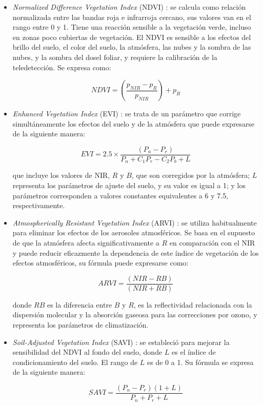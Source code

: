 \begin{itemize}
	\item \textit{Normalized Difference Vegetation Index} (NDVI) \citep{Xue2017}: se calcula como 
	   	relación normalizada entre las bandas roja e infrarroja cercano, sus valores van en el rango
	   	entre 0 y 1. Tiene una reacción sensible a la vegetación verde, incluso en zonas poco cubiertas
		de vegetación. El NDVI es sensible a los efectos del brillo del suelo, el color del suelo,
		la atmósfera, las nubes y la sombra de las nubes, y la sombra del dosel foliar, y requiere
		la calibración de la teledetección. Se expresa como:
	
		\begin{equation}
			NDVI = \left( \frac{p_{NIR} - p_{R}}{p_{NIR}} \right) + p_{R}
		\end{equation}

	\item \textit{Enhanced Vegetation Index} (EVI) \citep{Xue2017}: se trata de un parámetro que corrige simultáneamente 
		los efectos del suelo y de la atmósfera que puede expresarse de la siguiente manera:
	
		\begin{equation}
			EVI = 2.5 \times \frac{(P_n - P_r)}{P_n + C_1 P_r - C_2 P_b + L}
		\end{equation}
				
		que incluye los valores de NIR, $R$ y $B$, que son corregidos por la atmósfera; $L$ representa los parámetros
		de ajuste del suelo, y su valor es igual a 1; y los parámetros corresponden a valores constantes 
		equivalentes a 6 y 7.5, respectivamente.	

	\item \textit{Atmospherically Resistant Vegetation Index} (ARVI) \citep{Xue2017}: se utiliza habitualmente para eliminar los efectos de los
		aerosoles atmosféricos. Se basa en el supuesto de que la atmósfera afecta significativamente a $R$ en comparación con el 
		NIR y puede reducir eficazmente la dependencia de este índice de vegetación de los efectos atmosféricos, su fórmula puede 
		expresarse como: 
		
		\begin{equation}
			ARVI = \frac{(NIR - RB)}{(NIR + RB)}
		\end{equation}

		donde $RB$ es la diferencia entre $B$ y $R$, es la reflectividad relacionada con la dispersión molecular
		y la absorción gaseosa para las correcciones por ozono, y representa los parámetros de 
		climatización.
	
	\item \textit{Soil-Adjusted Vegetation Index} (SAVI) \citep{Xue2017}: se estableció para mejorar la 
		sensibilidad del NDVI al fondo del suelo, donde $L$ es el índice de condicionamiento del suelo.
		El rango de $L$ es de 0 a 1. Su fórmula se expresa de la siguiente manera:

		\begin{equation}
			SAVI = \frac{(P_n - P_r)(1 + L)}{P_n + P_r + L}
		\end{equation}
\end{itemize}

